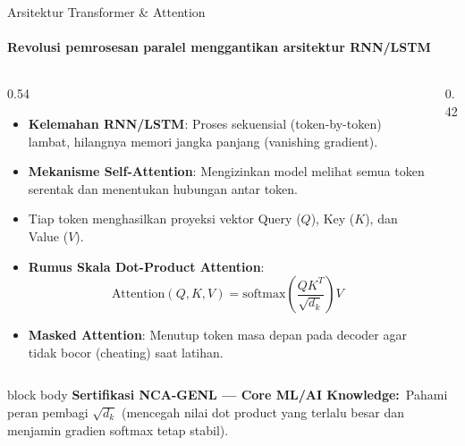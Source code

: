 \documentclass[aspectratio=169,t]{beamer}
\newcommand{\certnote}[2]{%
  \vspace{0.1em}
  \begin{beamercolorbox}[rounded=true,shadow=false,sep=4pt]{block body}
    {\scriptsize\color{nvblue}\textbf{Sertifikasi NCA-GENL --- #1:}}\,
    {\scriptsize\color{nvgray}#2}
  \end{beamercolorbox}%
}
\begin{document}
\begin{frame}{Arsitektur Transformer \& Attention}
  \framesubtitle{Revolusi pemrosesan paralel menggantikan arsitektur RNN/LSTM}
  \begin{columns}[T]
    \begin{column}{0.54\textwidth}
      \begin{itemize}\scriptsize
        \item \textbf{Kelemahan RNN/LSTM}: Proses sekuensial (token-by-token) lambat, hilangnya memori jangka panjang (vanishing gradient).
        \item \textbf{Mekanisme Self-Attention}: Mengizinkan model melihat semua token serentak dan menentukan hubungan antar token.
        \item Tiap token menghasilkan proyeksi vektor Query ($Q$), Key ($K$), dan Value ($V$).
        \item \textbf{Rumus Skala Dot-Product Attention}:
          $$\text{Attention}(Q, K, V) = \text{softmax}\left(\frac{QK^T}{\sqrt{d_k}}\right)V$$
        \item \textbf{Masked Attention}: Menutup token masa depan pada decoder agar tidak bocor (cheating) saat latihan.
      \end{itemize}
    \end{column}
    \begin{column}{0.42\textwidth}
      \begin{center}
      \end{center}
    \end{column}
  \end{columns}
  \certnote{Core ML/AI Knowledge}{Pahami peran pembagi $\sqrt{d_k}$ (mencegah nilai dot product yang terlalu besar dan menjamin gradien softmax tetap stabil).}
\end{frame}
\end{document}
